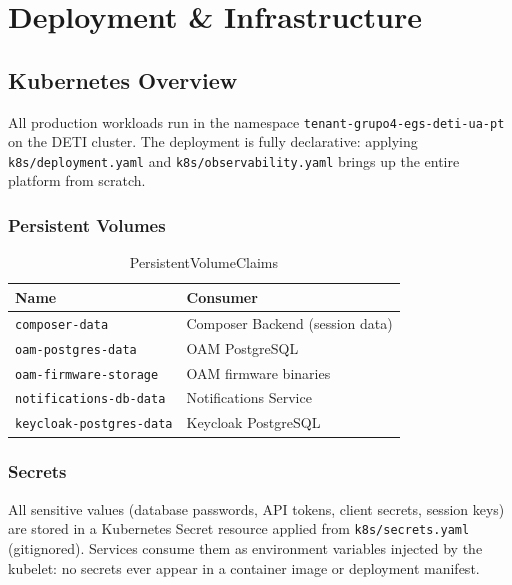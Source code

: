 \documentclass[12pt,a4paper,oneside]{report}
\begin{document}
\chapter{Deployment \& Infrastructure}
\label{ch:deployment}

\section{Kubernetes Overview}

All production workloads run in the namespace \texttt{tenant-grupo4-egs-deti-ua-pt} on the DETI cluster. The deployment is fully declarative: applying \texttt{k8s/deployment.yaml} and \texttt{k8s/observability.yaml} brings up the entire platform from scratch.

\subsection{Persistent Volumes}

\begin{table}[H]
\centering
\caption{PersistentVolumeClaims}
\label{tab:pvcs}
\renewcommand{\arraystretch}{1.3}
\begin{tabular}{l l}
\toprule
\textbf{Name} & \textbf{Consumer} \\
\midrule
\texttt{composer-data}          & Composer Backend (session data) \\
\texttt{oam-postgres-data}      & OAM PostgreSQL \\
\texttt{oam-firmware-storage}   & OAM firmware binaries \\
\texttt{notifications-db-data}  & Notifications Service \\
\texttt{keycloak-postgres-data} & Keycloak PostgreSQL \\
\bottomrule
\end{tabular}
\end{table}

\subsection{Secrets}

All sensitive values (database passwords, API tokens, client secrets, session keys) are stored in a Kubernetes Secret resource applied from \texttt{k8s/secrets.yaml} (gitignored). Services consume them as environment variables injected by the kubelet: no secrets ever appear in a container image or deployment manifest.
\end{document}
